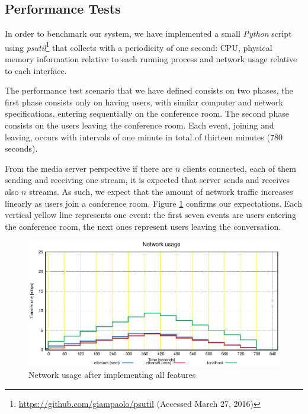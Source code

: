 \documentclass[10pt,conference]{IEEEtran}
\begin{document}
  \subsection {Performance Tests}

      In order to benchmark our system, we have implemented a small \emph{Python} script using \emph{psutil}\footnote{\url{https://github.com/giampaolo/psutil} (Accessed March 27, 2016)} that collects with a periodicity of one second: CPU, physical memory information relative to each running process and network usage relative to each interface. 

      The performance test scenario that we have defined consists on two phases, the first phase consists only on having users, with similar computer and network specifications, entering sequentially on the conference room. The second phase consists on the users leaving the conference room. Each event, joining and leaving, occurs with intervals of one minute in total of thirteen minutes (780 seconds).
  
      From the media server perspective if there are $n$ clients connected, each of them sending and receiving one stream, it is expected that server sends and receives also $n$ streams. As such, we expect that the amount of network traffic increases linearly as users join a conference room. Figure \ref{fig:test_full_features_net} confirms our expectations. Each vertical yellow line represents one event: the first seven events are users entering the conference room, the next ones represent users leaving the conversation. 
     

\begin{figure}
  \centering
  \includegraphics[width=\linewidth]{stats/test_full_features_net.eps}
  \caption{Network usage after implementing all features}
  \label{fig:test_full_features_net}
\end{figure}
\end{document}
